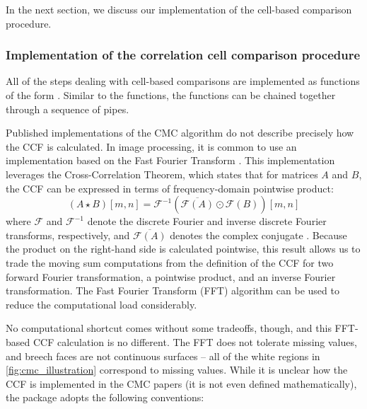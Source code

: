 In the next section, we discuss our implementation of the cell-based
comparison procedure.

\hypertarget{implementation-of-the-correlation-cell-comparison-procedure}{%
\subsubsection{Implementation of the correlation cell comparison
procedure}\label{implementation-of-the-correlation-cell-comparison-procedure}}

All of the steps dealing with cell-based comparisons are implemented as
functions of the form . Similar to the
 functions, the  functions can
be chained together through a sequence of pipes.

Published implementations of the CMC algorithm do not describe precisely
how the CCF is calculated. In image processing, it is common to use an
implementation based on the Fast Fourier Transform
\citep{Brown92asurvey}. This implementation leverages the
Cross-Correlation Theorem, which states that for matrices \(A\) and
\(B\), the CCF can be expressed in terms of frequency-domain pointwise
product: \[
(A \star B )[m,n]= \mathcal{F}^{-1}\left(\overline{\mathcal{F}(A)} \odot \mathcal{F}(B)\right)[m,n]
\] where \(\mathcal{F}\) and \(\mathcal{F}^{-1}\) denote the discrete
Fourier and inverse discrete Fourier transforms, respectively, and
\(\overline{\mathcal{F}(A)}\) denotes the complex conjugate
\citep{fft_brigham}. Because the product on the right-hand side is
calculated pointwise, this result allows us to trade the moving sum
computations from the definition of the CCF for two forward Fourier
transformation, a pointwise product, and an inverse Fourier
transformation. The Fast Fourier Transform (FFT) algorithm can be used
to reduce the computational load considerably.

No computational shortcut comes without some tradeoffs, though, and this
FFT-based CCF calculation is no different. The FFT does not tolerate
missing values, and breech faces are not continuous surfaces -- all of
the white regions in \autoref{fig:cmc_illustration} correspond to
missing values. While it is unclear how the CCF is implemented in the
CMC papers (it is not even defined mathematically), the 
package adopts the following conventions:

